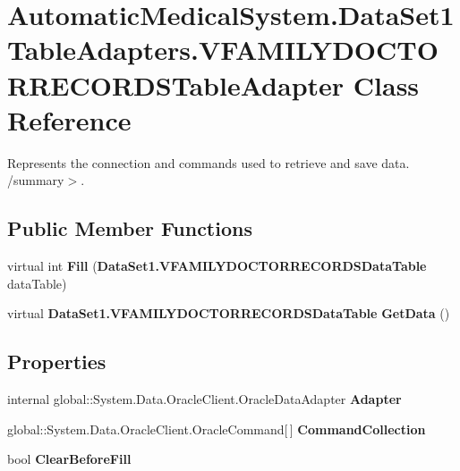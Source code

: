 \section{AutomaticMedicalSystem.DataSet1TableAdapters.VFAMILYDOCTORRECORDSTableAdapter Class Reference}
\label{class_automatic_medical_system_1_1_data_set1_table_adapters_1_1_v_f_a_m_i_l_y_d_o_c_t_o_r_r_e_c_o_r_d_s_table_adapter}
Represents the connection and commands used to retrieve and save data. /summary$>$.  


\subsection*{Public Member Functions}
\begin{CompactItemize}
\item 
virtual int \textbf{Fill} ({\bf DataSet1.VFAMILYDOCTORRECORDSDataTable} dataTable)\label{class_automatic_medical_system_1_1_data_set1_table_adapters_1_1_v_f_a_m_i_l_y_d_o_c_t_o_r_r_e_c_o_r_d_s_table_adapter_e0cc70739c71225d97a19f0ade5c321a}

\item 
virtual {\bf DataSet1.VFAMILYDOCTORRECORDSDataTable} \textbf{GetData} ()\label{class_automatic_medical_system_1_1_data_set1_table_adapters_1_1_v_f_a_m_i_l_y_d_o_c_t_o_r_r_e_c_o_r_d_s_table_adapter_549c2ee47ce9f8d5ba4e507c5b01d268}

\end{CompactItemize}
\subsection*{Properties}
\begin{CompactItemize}
\item 
internal global::System.Data.OracleClient.OracleDataAdapter \textbf{Adapter}\hspace{0.3cm}{\tt  [get]}\label{class_automatic_medical_system_1_1_data_set1_table_adapters_1_1_v_f_a_m_i_l_y_d_o_c_t_o_r_r_e_c_o_r_d_s_table_adapter_56e94a90dc7b673044cd5b2a8f16c53b}

\item 
global::System.Data.OracleClient.OracleCommand[$\,$] \textbf{CommandCollection}\hspace{0.3cm}{\tt  [get]}\label{class_automatic_medical_system_1_1_data_set1_table_adapters_1_1_v_f_a_m_i_l_y_d_o_c_t_o_r_r_e_c_o_r_d_s_table_adapter_07532d7fed869a356ebda65d98732d26}

\item 
bool \textbf{ClearBeforeFill}\hspace{0.3cm}{\tt  [get, set]}\label{class_automatic_medical_system_1_1_data_set1_table_adapters_1_1_v_f_a_m_i_l_y_d_o_c_t_o_r_r_e_c_o_r_d_s_table_adapter_469c79d804e2e683e987b70fd87bd8ae}

\end{CompactItemize}


